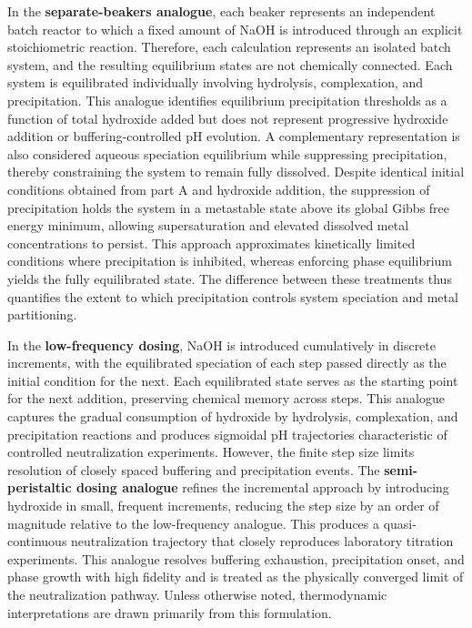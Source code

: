 \documentclass[final,2p,times]{elsarticle}
\begin{document}
In the \textbf{separate-beakers analogue}, each beaker represents an independent batch reactor to which a fixed amount of NaOH is introduced through an explicit stoichiometric reaction. Therefore, each calculation represents an isolated batch system, and the resulting equilibrium states are not chemically connected. Each system is equilibrated individually involving hydrolysis, complexation, and precipitation. This analogue identifies equilibrium precipitation thresholds as a function of total hydroxide added but does not represent progressive hydroxide addition or buffering-controlled pH evolution. A complementary representation is also considered aqueous speciation equilibrium while suppressing precipitation, thereby constraining the system to remain fully dissolved. Despite identical initial conditions obtained from part A and hydroxide addition, the suppression of precipitation holds the system in a metastable state above its global Gibbs free energy minimum, allowing supersaturation and elevated dissolved metal concentrations to persist. This approach approximates kinetically limited conditions where precipitation is inhibited, whereas enforcing phase equilibrium yields the fully equilibrated state. The difference between these treatments thus quantifies the extent to which precipitation controls system speciation and metal partitioning.

In the \textbf{low-frequency dosing}, NaOH is introduced cumulatively in discrete increments, with the equilibrated speciation of each step passed directly as the initial condition for the next. Each equilibrated state serves as the starting point for the next addition, preserving chemical memory across steps. This analogue captures the gradual consumption of hydroxide by hydrolysis, complexation, and precipitation reactions and produces sigmoidal pH trajectories characteristic of controlled neutralization experiments. However, the finite step size limits resolution of closely spaced buffering and precipitation events. The \textbf{semi-peristaltic dosing analogue} refines the incremental approach by introducing hydroxide in small, frequent increments, reducing the step size by an order of magnitude relative to the low-frequency analogue. This produces a quasi-continuous neutralization trajectory that closely reproduces laboratory titration experiments. This analogue resolves buffering exhaustion, precipitation onset, and phase growth with high fidelity and is treated as the physically converged limit of the neutralization pathway. Unless otherwise noted, thermodynamic interpretations are drawn primarily from this formulation.
\end{document}

